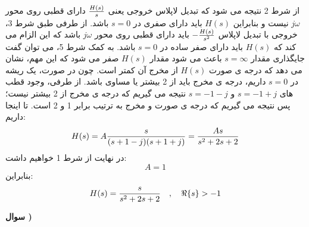 \documentclass[10pt,letterpaper]{article}
\newcounter{QuestionNumber}
\newcommand{\Q}{
\textbf{
سوال \theQuestionNumber)
}
\stepcounter{QuestionNumber}
}
\begin{document}
از شرط 2 نتیجه می شود که تبدیل لاپلاس خروجی یعنی 
$
{H(s)\over s}
$
 دارای قطبی روی محور $j\omega$ نیست و بنابراین 
$
H(s)
$
باید دارای صفری در 
$
s=0
$
باشد. از طرفی طبق شرط 3، خروجی با تبدیل لاپلاس 
$
-{H(s)\over s^2}
$
 باید دارای قطبی روی محور $j\omega$ باشد که این الزام می کند که $H(s)$ باید دارای صفر ساده در $s=0$ باشد. به کمک شرط 5، می توان گفت جایگذاری مقدار $s=\infty$ باعث می شود مقدار $H(s)$ صفر می شود که این مهم، نشان می دهد که درجه ی صورت $H(s)$ از مخرج آن کمتر است. چون در صورت، یک ریشه در $s=0$ داریم، درجه ی مخرج باید از 2 بیشتر یا مساوی باشد. از طرفی، وجود قطب های $
s=-1+j
$
و
$
s=-1-j
$
نتیجه می گیریم که درجه ی مخرج از 2 بیشتر نیست؛ پس نتیجه می گیریم که درجه ی صورت و مخرج به ترتیب برابر 1 و 2 است. تا اینجا داریم:
$$
H(s)=A{s\over (s+1-j)(s+1+j)}={As\over s^2+2s+2}
$$
در نهایت از شرط 1 خواهیم داشت:
$$
A=1
$$
بنابراین:
$$
H(s)={s\over s^2+2s+2}\quad,\quad \Re\{s\}>-1
$$
\Q
\end{document}
